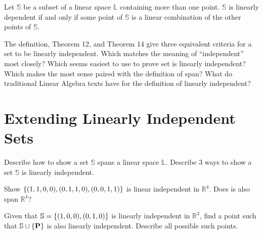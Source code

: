 \begin{theorem}
	Let $\mathbb{S}$ be a subset of a linear space $\mathbb{L}$ containing more than one point. $\mathbb{S}$ is linearly dependent if and only if some point of $\mathbb{S}$ is a linear combination of the other points of $\mathbb{S}$. 
\end{theorem}
\vspace{-.3in}\hspace{5in}\begin{annotation}
\end{annotation}


\noindent {}
   The definition, Theorem 12, and Theorem 14 give three equivalent criteria for a set to be linearly independent. Which matches the meaning of ``independent'' most closely? Which seems easiest to use to prove set is linearly independent? Which makes the most sense paired with the definition of span? What do traditional Linear Algebra texts have for the definition of linearly independent? 
   
\section{Extending Linearly Independent Sets}    \label{Extending Linearly Independent Sets}   

\begin{myexa}[\bd{a}]
	Describe how to show a set $\mathbb{S}$ spans a linear space $\mathbb{L}$. Describe 3 ways to show a set $\mathbb{S}$ is linearly independent. 
\end{myexa}

\begin{myexb}[\bd{b}]
	Show $\{ ({1},{1},{0},{0}),({0},{1},{1},{0}),({0},{0},{1},{1}) \} $ is linear independent in $\mathbb{R}^4$. Does is also span $\mathbb{R}^4$?
\end{myexb}

\begin{myexc}[\bd{c}]
	Given that $\mathbb{S} = \{ ({1},{0},{0}),({0},{1},{0}) \} $ is linearly independent in $\mathbb{R}^3$, find a point  such that $\mathbb{S} \cup \{\textbf{P}\}$ is also linearly independent. Describe all possible such points. 
\end{myexc}


